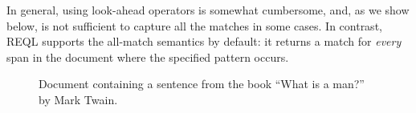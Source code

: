 In general, using look-ahead operators is somewhat cumbersome, and, as we show below, is not sufficient to capture all the matches in some cases. In contrast, REQL supports the all-match semantics by default: it returns a match for \emph{every} span in the document where the specified pattern occurs.


\begin{figure}
	\begin{center}
	\end{center}
	\vspace*{-7mm}
	\caption{Document containing a sentence from the book ``What is a man?'' by Mark Twain.}
	\label{fig-doc2}
\end{figure}

